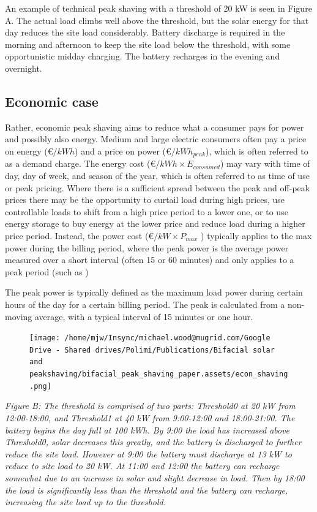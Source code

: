 \documentclass[
]{article}
\begin{document}
An example of technical peak shaving with a threshold of 20 kW is seen
in Figure A. The actual load climbs well above the threshold, but the
solar energy for that day reduces the site load considerably. Battery
discharge is required in the morning and afternoon to keep the site load
below the threshold, with some opportunistic midday charging. The
battery recharges in the evening and overnight.

\hypertarget{economic-case}{%
\subsection{Economic case}\label{economic-case}}

Rather, economic peak shaving aims to reduce what a consumer pays for
power and possibly also energy. Medium and large electric consumers
often pay a price on energy (€\(/kWh\)) and a price on power
(€\(/kWh_{peak}\)), which is often referred to as a demand charge. The
energy cost (€\(/kWh \times E_{consumed}\)) may vary with time of day,
day of week, and season of the year, which is often referred to as time
of use or peak pricing. Where there is a sufficient spread between the
peak and off-peak prices there may be the opportunity to curtail load
during high prices, use controllable loads to shift from a high price
period to a lower one, or to use energy storage to buy energy at the
lower price and reduce load during a higher price period. Instead, the
power cost (€\(/kW \times P_{max}\) ) typically applies to the max power
during the billing period, where the peak power is the average power
measured over a short interval (often 15 or 60 minutes) and only applies
to a peak period (such as )

The peak power is typically defined as the maximum load power during
certain hours of the day for a certain billing period. The peak is
calculated from a non-moving average, with a typical interval of 15
minutes or one hour.

\begin{figure}
\centering
\texttt{[image: /home/mjw/Insync/michael.wood@mugrid.com/Google Drive - Shared drives/Polimi/Publications/Bifacial solar and peakshaving/bifacial\_peak\_shaving\_paper.assets/econ\_shaving.png]}
\caption{}
\end{figure}

\emph{Figure B: The threshold is comprised of two parts: Threshold0 at
20 kW from 12:00-18:00, and Threshold1 at 40 kW from 9:00-12:00 and
18:00-21:00. The battery begins the day full at 100 kWh. By 9:00 the
load has increased above Threshold0, solar decreases this greatly, and
the battery is discharged to further reduce the site load. However at
9:00 the battery must discharge at 13 kW to reduce to site load to 20
kW. At 11:00 and 12:00 the battery can recharge somewhat due to an
increase in solar and slight decrease in load. Then by 18:00 the load is
significantly less than the threshold and the battery can recharge,
increasing the site load up to the threshold.}
\end{document}
